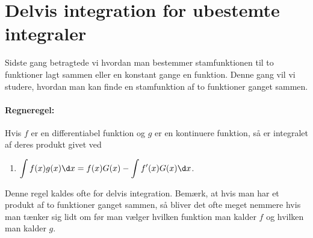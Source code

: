 \section{Delvis integration for ubestemte integraler}
\noindent Sidste gang betragtede vi hvordan man bestemmer stamfunktionen til to funktioner lagt sammen eller en konstant gange en funktion. Denne gang vil vi studere, hvordan man kan finde en stamfunktion af to funktioner ganget sammen.

\paragraph*{Regneregel:}
Hvis $f$ er en differentiabel funktion og $g$ er en kontinuere funktion, så er integralet af deres produkt givet ved
\begin{enumerate}
\item $\displaystyle \int f(x)g(x) \d x = f(x)G(x)-\int f'(x)G(x) \d x$.
\end{enumerate}
Denne regel kaldes ofte for delvis integration. Bemærk, at hvis man har et produkt af to funktioner ganget sammen, så bliver det ofte meget nemmere hvis man tænker sig lidt om før man vælger hvilken funktion man kalder $f$ og hvilken man kalder $g$.

